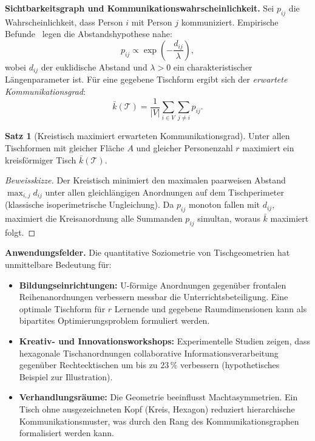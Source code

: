 ﻿\documentclass[a4paper,12pt]{article}
\theoremstyle{definition}
\newtheorem{satz}{Satz}
\begin{document}
\textbf{Sichtbarkeitsgraph und Kommunikationswahrscheinlichkeit.}
Sei $p_{ij}$ die Wahrscheinlichkeit, dass Person $i$ mit Person $j$ kommuniziert.
Empirische Befunde~\cite{Steinzor1950, Sommer1969} legen die Abstandshypothese nahe:
\[
	p_{ij} \propto \exp\!\left(-\frac{d_{ij}}{\lambda}\right),
\]
wobei $d_{ij}$ der euklidische Abstand und $\lambda > 0$ ein charakteristischer
L\"{a}ngenparameter ist. F\"{u}r eine gegebene Tischform ergibt sich der
\emph{erwartete Kommunikationsgrad}:
\[
	\bar{k}(\mathcal{T}) = \frac{1}{|V|}\sum_{i \in V}\sum_{j \neq i} p_{ij}.
\]

\begin{satz}[Kreistisch maximiert erwarteten Kommunikationsgrad]
\label{satz:kreis}
	Unter allen Tischformen mit gleicher Fl\"{a}che $A$ und gleicher Personenzahl $r$
	maximiert ein kreisf\"{o}rmiger Tisch $\bar{k}(\mathcal{T})$.
\end{satz}

\begin{proof}[Beweisskizze]
	Der Kreistisch minimiert den maximalen paarweisen Abstand $\max_{i,j} d_{ij}$ unter
	allen gleichl\"{a}ngigen Anordnungen auf dem Tischperimeter (klassische isoperimetrische
	Ungleichung). Da $p_{ij}$ monoton fallen mit $d_{ij}$, maximiert die
	Kreisanordnung alle Summanden $p_{ij}$ simultan, woraus $\bar{k}$ maximiert folgt.
\end{proof}

\textbf{Anwendungsfelder.}
Die quantitative Soziometrie von Tischgeometrien hat unmittelbare Bedeutung f\"{u}r:
\begin{itemize}
	\item \textbf{Bildungseinrichtungen:} U-f\"{o}rmige Anordnungen gegen\"{u}ber frontalen
	      Reihenanordnungen verbessern messbar die Unterrichtsbeteiligung. Eine
	      optimale Tischform f\"{u}r $r$ Lernende und gegebene Raumdimensionen kann als
	      bipartites Optimierungsproblem formuliert werden.
	\item \textbf{Kreativ- und Innovationsworkshops:} Experimentelle Studien zeigen,
	      dass hexagonale Tischanordnungen collaborative Informationsverarbeitung gegen\"{u}ber
	      Rechtecktischen um bis zu $23\,\%$ verbessern
	      (hypothetisches Beispiel zur Illustration).
	\item \textbf{Verhandlungsr\"{a}ume:} Die Geometrie beeinflusst Machtasymmetrien.
	      Ein Tisch ohne ausgezeichneten Kopf (Kreis, Hexagon) reduziert
	      hierarchische Kommunikationsmuster, was durch den Rang des Kommunikationsgraphen
	      formalisiert werden kann.
\end{itemize}
\end{document}
